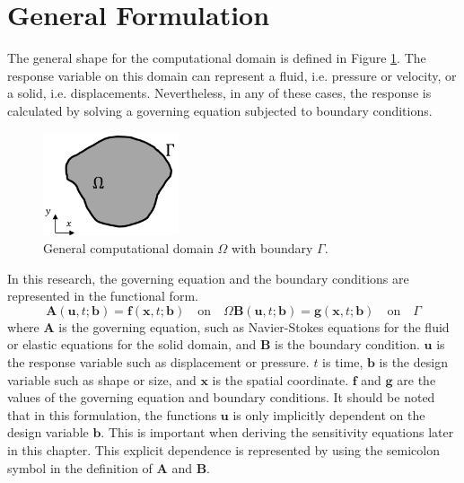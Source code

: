 \section{General Formulation}
The general shape for the computational domain is defined in Figure \ref{fig:C2_continuumDomain}. The response variable on this domain can represent a fluid, i.e. pressure or velocity, or a solid, i.e. displacements. Nevertheless, in any of these cases, the response is calculated by solving a governing equation subjected to boundary conditions. 
%
\begin{figure}
    \centering
    \includegraphics[width=4.00cm]{Chapter_2/figure/general_domain.png}
    \caption{General computational domain $\Omega$ with boundary $\Gamma$.}
    \label{fig:C2_continuumDomain}
\end{figure}
%
In this research, the governing equation and the boundary conditions are represented in the functional form.
%
\begin{subequations}\label{eq:C2_governingEquationAndBC}
\begin{equation}\label{eq:C2_generalGoverningEquation}
    \mathbf{A}(\mathbf{u}, t; \mathbf{b}) = \mathbf{f}(\mathbf{x}, t; \mathbf{b})
    \quad \text{on} \quad \Omega
\end{equation}
\begin{equation}\label{eq:C2_generalBoundaryCondition}
    \mathbf{B}(\mathbf{u}, t; \mathbf{b}) = \mathbf{g}(\mathbf{x}, t; \mathbf{b})    
    \quad \text{on} \quad \Gamma
\end{equation}
\end{subequations}
%
where $\mathbf{A}$ is the governing equation, such as Navier-Stokes equations for the fluid or elastic equations for the solid domain, and $\mathbf{B}$ is the boundary condition. $\mathbf{u}$ is the response variable such as displacement or pressure. $t$ is time, $\mathbf{b}$ is the design variable such as shape or size, and $\mathbf{x}$ is the spatial coordinate. $\mathbf{f}$ and $\mathbf{g}$ are the values of the governing equation and boundary conditions. It should be noted that in this formulation, the functions $\mathbf{u}$ is only implicitly dependent on the design variable $\mathbf{b}$. This is important when deriving the sensitivity equations later in this chapter. This explicit dependence is represented by using the semicolon symbol in the definition of $\mathbf{A}$ and $\mathbf{B}$.

